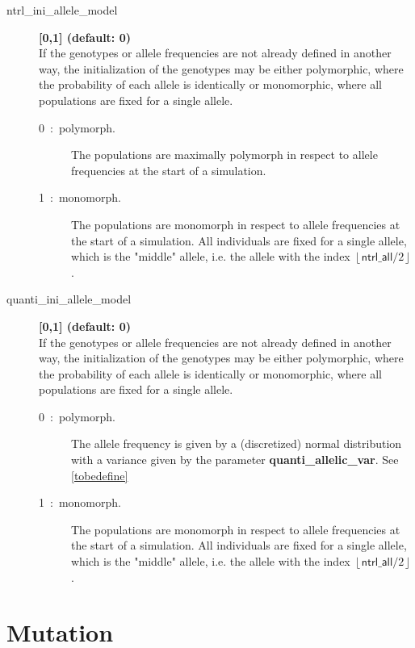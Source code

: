 \documentclass[letterpaper,12pt,oneside]{book}
\begin{document}
\begin{description}
\item[ntrl\_ini\_allele\_model] \textbf{[0,1] (default: 0)}\\
If the genotypes or allele frequencies are not already defined in another way, the initialization of the genotypes may be either polymorphic, where the probability of each allele is identically or monomorphic, where all populations are fixed for a single allele.   
\begin{description}
\item[0~:~polymorph.] The populations are maximally polymorph in respect to allele frequencies at the start of a simulation.
\item[1~:~monomorph.] The populations are monomorph in respect to allele frequencies at the start of a simulation. All individuals are fixed for a single allele, which is  the "middle" allele, i.e. the allele with the index $\left\lfloor \textsf{ntrl\_all}/2\right\rfloor$.
\end{description}
\item[quanti\_ini\_allele\_model] \textbf{[0,1] (default: 0)}\\
If the genotypes or allele frequencies are not already defined in another way, the initialization of the genotypes may be either polymorphic, where the probability of each allele is identically or monomorphic, where all populations are fixed for a single allele.   
\begin{description}
\item[0~:~polymorph.] The allele frequency is given by a (discretized) normal distribution with a variance given by the parameter \textbf{quanti\_allelic\_var}. See \ref{tobedefine}
\item[1~:~monomorph.] The populations are monomorph in respect to allele frequencies at the start of a simulation. All individuals are fixed for a single allele, which is  the "middle" allele, i.e. the allele with the index $\left\lfloor \textsf{ntrl\_all}/2\right\rfloor$.
\end{description}
\end{description}

\section{Mutation}
\end{document}
